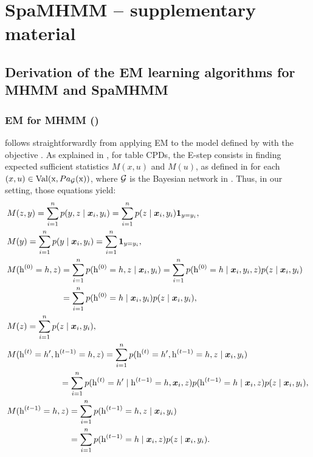 
\chapter{SpaMHMM -- supplementary material} %

\label{appendix:spamhmm} %

\section{Derivation of the EM learning algorithms for MHMM and SpaMHMM}

\subsection{EM for MHMM ()}
\label{sec:proof_em_noreg}
 follows straightforwardly from applying EM to the model defined by  with the objective . As explained in , for table CPDs, the E-step consists in finding expected sufficient statistics $M(x, u)$ and $M(u)$, as defined in  for each $(x, u) \in \mathrm{Val}({\textnormal{x}},  Pa_{\mathcal{G}}({\textnormal{x}}))$, where ${\mathcal{G}}$ is the Bayesian network in . Thus, in our setting, those equations yield:
\begingroup
\allowdisplaybreaks
\begin{align}
	&M(z,y) = \sum_{i=1}^{n} p(y, z \mid \vx_i, y_i) = \sum_{i=1}^{n} p(z \mid \vx_i, y_i) \1_{y=y_i}, \\
	&M(y) = \sum_{i=1}^{n} p(y \mid \vx_i, y_i) = \sum_{i=1}^{n} \1_{y=y_i}, \\
	&M(\rh^{(0)}=h, z) = \sum_{i=1}^{n} p(\rh^{(0)}=h, z \mid \vx_i, y_i) = \sum_{i=1}^{n} p(\rh^{(0)}=h \mid \vx_i, y_i, z) p(z \mid \vx_i, y_i) \nonumber\\
	&\hphantom{M(\rh^{(0)}=h,z)} = \sum_{i=1}^{n} p(\rh^{(0)}=h \mid \vx_i, y_i) p(z \mid \vx_i, y_i), \\
	&M(z) = \sum_{i=1}^{n} p(z \mid \vx_i, y_i), \\
	&M(\rh^{(t)}=h', \rh^{(t-1)}=h, z) = \sum_{i=1}^{n} p(\rh^{(t)}=h', \rh^{(t-1)}=h, z \mid \vx_i, y_i) \nonumber\\
	&\hphantom{M(\rh^{(t-1)}=h, } = \sum_{i=1}^{n} p(\rh^{(t)}=h' \mid \rh^{(t-1)}=h, \vx_i, z) p(\rh^{(t-1)}=h \mid \vx_i, z) p(z \mid \vx_i, y_i), \\
	&M(\rh^{(t-1)}=h, z) = \sum_{i=1}^{n} p(\rh^{(t-1)}=h, z \mid \vx_i, y_i) \nonumber\\
	&\hphantom{M(\rh^{(t-1)}=h, z)} = \sum_{i=1}^{n} p(\rh^{(t-1)}=h \mid \vx_i, z) p(z \mid \vx_i, y_i).
\end{align}
